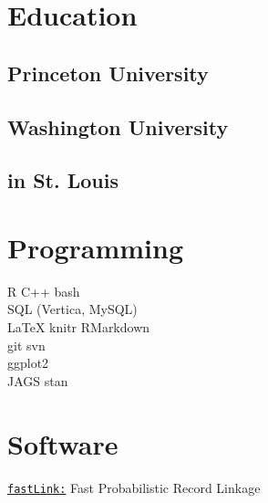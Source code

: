\documentclass[]{deedy-resume-openfont}
\begin{document}
\begin{minipage}[t]{0.33\textwidth} 


\section{Education} 

\subsection{Princeton University}
\sectionsep

\sectionsep

\subsection{Washington University}
\subsection{in St. Louis}
\sectionsep


\section{Programming}
	\quad R \textbullet{} C++ \textbullet{} bash \\
	\quad SQL (Vertica, MySQL)\\
	\quad \LaTeX \textbullet{} knitr \textbullet{} RMarkdown\\
	\quad git\textbullet{} svn\\
	\quad ggplot2\\
	\quad JAGS\textbullet{} stan\\
\sectionsep

\section{Software}
\href{https://github.com/kosukeimai/fastLink}{\texttt{fastLink:}} Fast Probabilistic Record Linkage \vspace{1mm}


\end{minipage}
\end{document}
